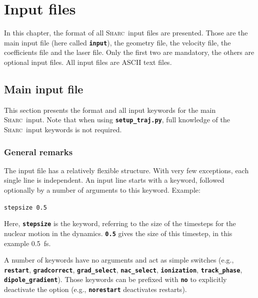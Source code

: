 \documentclass[a4paper,11pt,DIV=15,openany,twoside=false]{scrbook}
\newcommand{\sharc}{\textsc{Sharc}}
\newcommand{\ttt}[1]{\textbf{\texttt{#1}}}
\newenvironment{example}{
  \vspace{0mm}
  \definecolor{shadecolor}{HTML}{E4F4FF}
  \begin{shaded}
}{
  \end{shaded}
}
\begin{document}

\chapter{Input files}\label{chap:input}

In this chapter, the format of all \sharc\ input files are presented. Those are the main input file (here called \ttt{input}), the geometry file, the velocity file, the coefficients file and the laser file. Only the first two are mandatory, the others are optional input files. All input files are ASCII text files.


\section{Main input file}\label{sec:inputfile}

This section presents the format and all input keywords for the main \sharc\ input. Note that when using \ttt{setup\_traj.py}, full knowledge of the \sharc\ input keywords is not required.

\subsection{General remarks}

The input file has a relatively flexible structure. With very few exceptions, each single line is independent. An input line starts with a keyword, followed optionally by a number of arguments to this keyword. Example:

\begin{example}
  \verb|stepsize 0.5|
\end{example}

Here, \ttt{stepsize} is the keyword, referring to the size of the timesteps for the nuclear motion in the dynamics. \ttt{0.5} gives the size of this timestep, in this example 0.5~fs.

A number of keywords have no arguments and act as simple switches (e.g., \ttt{restart}, \ttt{gradcorrect}, \ttt{grad\_select}, \ttt{nac\_select}, \ttt{ionization}, \ttt{track\_phase}, \ttt{dipole\_gradient}). Those keywords can be prefixed with \ttt{no} to explicitly deactivate the option (e.g., \ttt{norestart} deactivates restarts).
\end{document}
